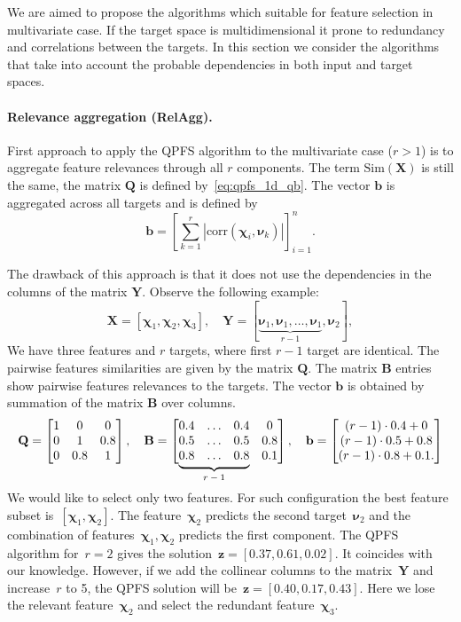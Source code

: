 \documentclass[12pt,twoside]{article}
\theoremstyle{definition}
\newcommand{\bz}{\mathbf{z}}
\newcommand{\bb}{\mathbf{b}}
\newcommand{\bY}{\mathbf{Y}}
\newcommand{\bX}{\mathbf{X}}
\newcommand{\bB}{\mathbf{B}}
\newcommand{\bQ}{\mathbf{Q}}
\newcommand{\bchi}{\boldsymbol{\chi}}
\newcommand{\bnu}{\boldsymbol{\nu}}
\newcommand\undermat[2]{%
	\makebox[0pt][l]{$\smash{\underbrace{\phantom{%
					\begin{matrix}#2\end{matrix}}}_{\text{$#1$}}}$}#2}
\begin{document}
We are aimed to propose the algorithms which suitable for feature selection in multivariate case. 
If the target space is multidimensional it prone to redundancy and correlations between the targets. 
In this section we consider the algorithms that take into account the probable dependencies in both input and target spaces.

\paragraph{Relevance aggregation (RelAgg).}

First approach to apply the QPFS algorithm to the multivariate case ($r > 1$) is to aggregate feature relevances through all $r$ components. The term $\text{Sim}(\bX)$ is still the same, the matrix $\bQ$ is defined by~\eqref{eq:qpfs_1d_qb}. The vector $\bb$ is aggregated across all targets and is defined by
\begin{equation*}
\bb = \left[\sum_{k=1}^r\left|\text{corr}(\bchi_i, \bnu_k)\right|\right]_{i=1}^n.
\end{equation*}

The drawback of this approach is that it does not use the dependencies in the columns of the matrix $\bY$. Observe the following example:
\[
	\bX = [\bchi_1, \bchi_2, \bchi_3], \quad \bY = [\underbrace{\bnu_1, \bnu_1, \dots, \bnu_1}_{r-1}, \bnu_2],
\]
We have three features and $r$ targets, where first $r-1$ target are identical.
The pairwise features similarities are given by the matrix $\bQ$.
The matrix $\bB$ entries show pairwise features relevances to the targets.
The vector $\bb$ is obtained by summation of the matrix $\bB$ over columns.
\begin{equation}
	\bQ = \begin{bmatrix} 1 & 0 & 0\\ 0 & 1 & 0.8 \\ 0 & 0.8 & 1 \end{bmatrix}, \quad
	\bB = \begin{bmatrix} 0.4 & \dots & 0.4 & 0 \\ 0.5 & \dots & 0.5 & 0.8 \\ \undermat{r-1}{0.8 & \dots & 0.8} & 0.1 \end{bmatrix}, \quad
	\bb = \begin{bmatrix} (r-1) \cdot 0.4 + 0 \\ (r-1) \cdot 0.5 + 0.8 \\ (r-1) \cdot 0.8 + 0.1. \end{bmatrix}
	\label{eq:qpfs_example}
\end{equation}
	\vspace{0.5cm} \\
We would like to select only two features.
For such configuration the best feature subset is~$[\bchi_1, \bchi_2]$.
The feature~$\bchi_2$ predicts the second target~$\bnu_2$ and the combination of features~$\bchi_1, \bchi_2$ predicts the first component.
The QPFS algorithm for~$r=2$ gives the solution~$\bz = [0.37,	0.61,	0.02]$. It coincides with our knowledge.
However, if we add the collinear columns to the matrix~$\bY$ and increase~$r$ to 5, the QPFS solution will be~$\bz = [0.40,	0.17, 0.43]$.
Here we lose the relevant feature~$\bchi_2$ and select the redundant feature~$\bchi_3$.
\end{document}
